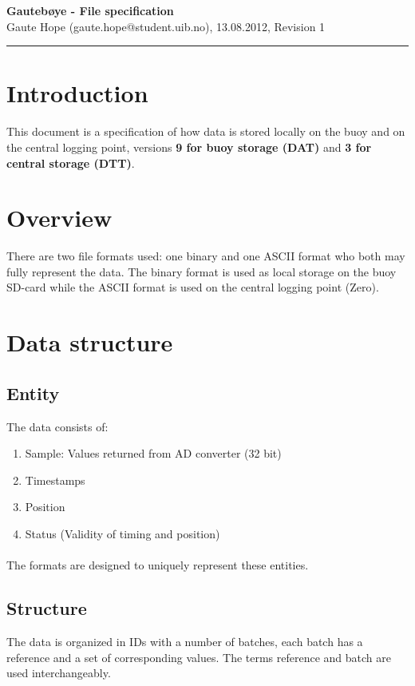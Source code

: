 \documentclass[a4paper]{article}
\newcommand{\makeheading}[2]%
        {\hspace*{-\marginparsep minus \marginparwidth}%
         \begin{minipage}[t]{\textwidth\marginparwidth\marginparsep}%
           {\large \bfseries #1}\\{#2}\\[-0.15\baselineskip]%
                 \rule{\columnwidth}{1pt}%
         \end{minipage}}
\begin{document}
\makeheading{Gautebøye - File specification}{Gaute Hope
(gaute.hope@student.uib.no), 13.08.2012, Revision 1}

\vspace{2em}
\section*{Introduction}
This document is a specification of how data is stored locally on the
buoy and on the central logging point, versions \textbf{9 for buoy
storage (DAT)} and \textbf{3 for central storage (DTT)}.

\vspace{2em}

\begin{multicols}{2}
  \section{Overview}
  There are two file formats used: one binary
  and one ASCII format who both may fully represent the data.
  The binary format is used as local storage on the
  buoy SD-card while the ASCII format is used on the central logging point
  (Zero).

  \section{Data structure}
    \subsection{Entity}
    The data consists of:
    \begin{enumerate}
      \item Sample: Values returned from AD converter (32 bit)
      \item Timestamps
      \item Position
      \item Status (Validity of timing and position)
    \end{enumerate}

    \paragraph{} The formats are designed to uniquely represent these
    entities.

    \subsection{Structure}
    The data is organized in IDs with a number of batches, each batch
    has a reference and a set of corresponding values. The terms reference and
    batch are used interchangeably.


\end{multicols}
\end{document}
